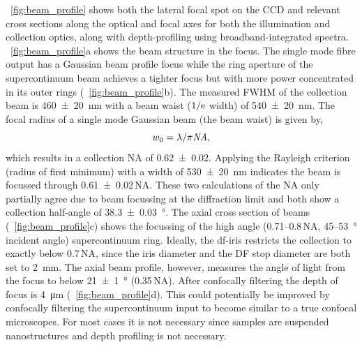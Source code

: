 \documentclass{article}
\begin{document}
\figurename~\ref{fig:beam_profile} shows both the lateral focal spot on the CCD and relevant cross sections along the optical and focal axes for both the illumination and collection optics, along with depth-profiling using broadband-integrated spectra. \figurename~\ref{fig:beam_profile}a shows the beam structure in the focus. The single mode fibre output has a Gaussian beam profile focus while the ring aperture of the supercontinuum beam achieves a tighter focus but with more power concentrated in its outer rings (\figurename~\ref{fig:beam_profile}b). The measured FWHM of the collection beam is \SI{460\pm20}{nm} with a beam waist ($1/\mathrm{e}$ width) of \SI{540\pm20}{nm}. The focal radius of a single mode Gaussian beam  (the beam waist) is given by,
\begin{equation}
	w_0 = \lambda/\pi\mathit{NA},
	\label{eq:gaussian_beam_waist}
\end{equation}
which results in a collection NA of \num{0.62\pm0.02}. Applying the Rayleigh criterion (radius of first minimum) with a width of \SI{530\pm20}{nm} indicates the beam is focussed through \num{0.61\pm0.02}\,NA. These two calculations of the NA only partially agree due to beam focussing at the diffraction limit and both show a collection half-angle of \SI{38.3\pm0.03}{\degree}. The axial cross section of beams (\figurename~\ref{fig:beam_profile}c) shows the focussing of the high angle (0.71--0.8\,NA, 45--\SI{53}{\degree} incident angle) supercontinuum ring. Ideally, the \gls{df}-iris restricts the collection to exactly below 0.7\,NA, since the iris diameter and the DF stop diameter are both set to \SI{2}{mm}. The axial beam profile, however, measures the angle of light from the focus to below \SI{21\pm1}{\degree} (0.35\,NA). After confocally filtering the depth of focus is \SI{4}{\micro\metre} (\figurename~\ref{fig:beam_profile}d).
This could potentially be improved by confocally filtering the supercontinuum input to become similar to a true confocal microscopes. For most cases it is not necessary since samples are suspended nanostructures and depth profiling is not necessary.
\end{document}

